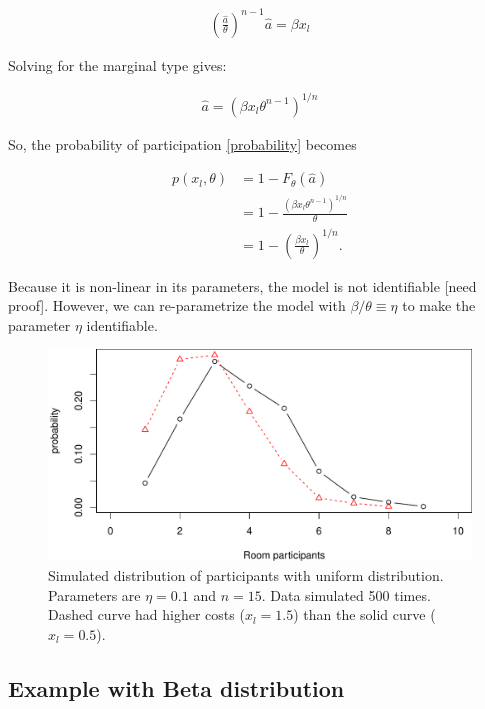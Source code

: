 \documentclass[]{article}
\theoremstyle{plain} %
\newcommand\mtype{\hat{a}}
\begin{document}
\begin{align}
    \left(\frac{\mtype}{\theta}\right)^{n-1} \mtype = \beta x_l 
\end{align}

Solving for the marginal type gives:

\begin{align}
    \mtype = \left(\beta x_l  \theta^{n-1}\right)^{1/n}
\end{align}

So, the probability of participation \eqref{probability} becomes

\begin{align}
    p(x_l, \theta) 
        & = 1 - F_\theta(\mtype) \\
        & = 1 - \frac{\left(\beta x_l \theta^{n-1}\right)^{1/n} }{\theta} \\
        & = 1 - \left(\frac{\beta x_l}{\theta}\right)^{1/n}.
\end{align}

Because it is non-linear in its parameters, the model is not
identifiable {[}need proof{]}. However, we can re-parametrize the model
with \(\beta/\theta \equiv \eta\) to make the parameter \(\eta\)
identifiable.

\begin{figure}
\centering
\includegraphics{structural_files/figure-latex/unnamed-chunk-2-1.pdf}
\caption{Simulated distribution of participants with uniform
distribution. Parameters are \(\eta=0.1\) and \(n=15\). Data simulated
500 times. Dashed curve had higher costs (\(x_l=1.5\)) than the solid
curve (\(x_l=0.5\)).}
\end{figure}

\subsection{Example with Beta
distribution}\label{example-with-beta-distribution}
\end{document}
